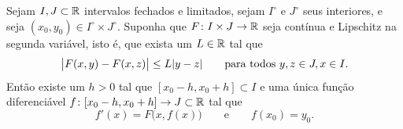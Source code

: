 \begin{samepage}
\begin{thm}%
Sejam $I, J \subset {\mathbb{R}}$ intervalos fechados e limitados,
sejam $I^\circ$ e $J^\circ$ seus interiores, e seja
$(x_0,y_0) \in I^\circ \times J^\circ$.
Suponha que $F \colon I \times J \to {\mathbb{R}}$ seja contínua
e Lipschitz na segunda variável, isto é, que exista
um $L \in {\mathbb{R}}$ tal que
\begin{equation*}
\bigl\lvert {F(x,y) - F(x,z)} \bigr\rvert \leq L \lvert {y-z} \rvert
\qquad \text{para todos } y,z \in J, x \in I .
\end{equation*}
Então existe um $h > 0$ tal que $[x_0-h,x_0+h] \subset I$ e uma única função diferenciável
$f \colon [x_0 - h, x_0 + h] \to J \subset {\mathbb{R}}$ tal que
\begin{equation*}
f'(x) = F\bigl(x,f(x)\bigr) \qquad \text{e} \qquad f(x_0) = y_0.
\end{equation*}
\end{thm}
\end{samepage}

